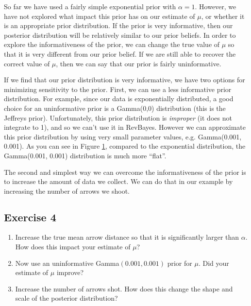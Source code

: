 So far we have used a fairly simple exponential prior with $\alpha = 1$.
However, we have not explored what impact this prior has on our estimate of $\mu$, or whether it is an appropriate prior distribution.
If the prior is very informative, then our posterior distribution will be relatively similar to our prior beliefs.
In order to explore the informativeness of the prior, we can change the true value of $\mu$ so that it is very different from our prior belief.
If we are still able to recover the correct value of $\mu$, then we can say that our prior is fairly uninformative.

If we find that our prior distribution is very informative, we have two options for minimizing sensitivity to the prior.
First, we can use a less informative prior distribution.
For example, since our data is exponentially distributed, a good choice for an uninformative prior is a Gamma(0,0) distribution (this is the Jeffreys prior).
Unfortunately, this prior distribution is \emph{improper} (it does not integrate to 1), and so we can't use it in RevBayes.
However we can approximate this prior distribution by using very small parameter values, e.g. Gamma(0.001, 0.001).
As you can see in Figure \ref{fig:gamma_distribution}, compared to the exponential distribution, the Gamma(0.001, 0.001) distribution is much more ``flat''.

\begin{figure}[h!]
\centering
{}
\label{fig:gamma_distribution}
\end{figure}

The second and simplest way we can overcome the informativeness of the prior is to increase the amount of data we collect.
We can do that in our example by increasing the number of arrows we shoot.

\subsection{Exercise 4}

\begin{enumerate}[label=\textnormal{Step \arabic*)},leftmargin=1.5cm]
	\item Increase the true mean arrow distance so that it is significantly larger than $\alpha$. How does this impact your estimate of $\mu$?
	\item Now use an uninformative Gamma$(0.001, 0.001)$ prior for $\mu$. Did your estimate of $\mu$ improve?
	\item Increase the number of arrows shot. How does this change the shape and scale of the posterior distribution?
\end{enumerate}



